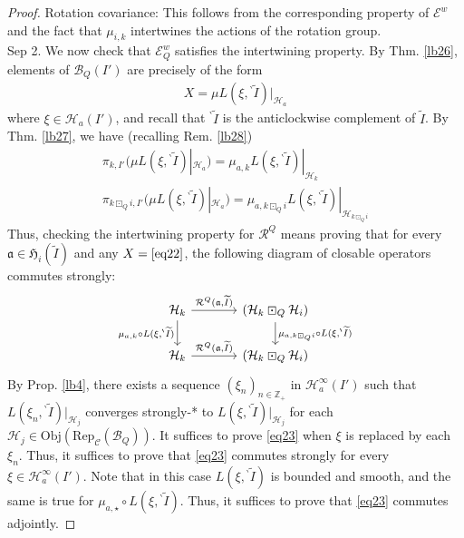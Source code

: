 \documentclass[11pt,b5paper,notitlepage]{article}
\theoremstyle{definition}
\theoremstyle{plain}
\newcommand{\fk}{\mathfrak}
\newcommand{\mc}{\mathcal}
\newcommand{\wtd}{\widetilde}
\newcommand{\Rep}{\mathrm{Rep}}
\newcommand{\scr}{\mathscr}
\newcommand{\Zbb}{\mathbb Z}
\newcommand{\Obj}{\mathrm{Obj}}
\newcommand{\bpr}{{}^\backprime}
\numberwithin{equation}{section}
\begin{document}
\begin{proof}
Rotation covariance: This follows from the corresponding property of $\scr E^w$ and the fact that $\mu_{i,k}$ intertwines the actions of the rotation group.\\[-1ex]

Sep 2. We now check that $\scr E^w_Q$ satisfies the intertwining property. By Thm. \ref{lb26}, elements of $\mc B_Q(I')$ are precisely of the form 
\begin{align}
X=\mu L(\xi,\bpr\wtd I)|_{\mc H_a} \label{eq22}
\end{align}
where $\xi\in\mc H_a(I')$, and recall that $\bpr\wtd I$ is the anticlockwise complement of $\wtd I$. By Thm. \ref{lb27}, we have (recalling Rem. \ref{lb28})
\begin{gather*}
\pi_{k,I'}(\mu L(\xi,\bpr\wtd I)|_{\mc H_a})=\mu_{a,k}L(\xi,\bpr\wtd I)|_{\mc H_k}\\
\pi_{k\boxdot_Q i,I'}(\mu L(\xi,\bpr\wtd I)|_{\mc H_a})=\mu_{a,k\boxdot_Q i}L(\xi,\bpr\wtd I)|_{\mc H_{k\boxdot_Q i}}
\end{gather*}
Thus, checking the intertwining property for $\mc R^Q$ means proving that for every $\fk a\in\fk H_i(\wtd I)$ and any $X=\eqref{eq22}$, the following diagram of closable operators commutes strongly:
\begin{equation}\label{eq23}
\begin{tikzcd}[column sep=large]
\mc H_k\arrow[r,"{\mc R^Q(\fk a,\wtd I)}"] \arrow[d,"{\mu_{a,k}\circ L(\xi,\bpr\wtd I)}"'] & (\mc H_k\boxdot_Q\mc H_i) \arrow[d,"{\mu_{a,k\boxdot_Q i}\circ L(\xi,\bpr\wtd I)}"] \\
\mc H_k \arrow[r,"{\mc R^Q(\fk a,\wtd I)}"]           & (\mc H_k\boxdot_Q\mc H_i)        
\end{tikzcd}
\end{equation}
By Prop. \ref{lb4}, there exists a sequence $(\xi_n)_{n\in\Zbb_+}$ in $\mc H_a^\infty(I')$ such that $L(\xi_n,\bpr\wtd I)|_{\mc H_j}$ converges strongly-* to $L(\xi,\bpr\wtd I)|_{\mc H_j}$ for each $\mc H_j\in\Obj(\Rep_{\scr C}(\mc B_Q))$. It suffices to prove \eqref{eq23} when $\xi$ is replaced by each $\xi_n$. Thus, it suffices to prove that \eqref{eq23} commutes strongly for every $\xi\in\mc H_a^\infty(I')$. Note that in this case $L(\xi,\bpr\wtd I)$ is bounded and smooth, and the same is true for $\mu_{a,\star}\circ L(\xi,\bpr\wtd I)$. Thus, it suffices to prove that \eqref{eq23} commutes adjointly. 


\end{proof}
\end{document}
